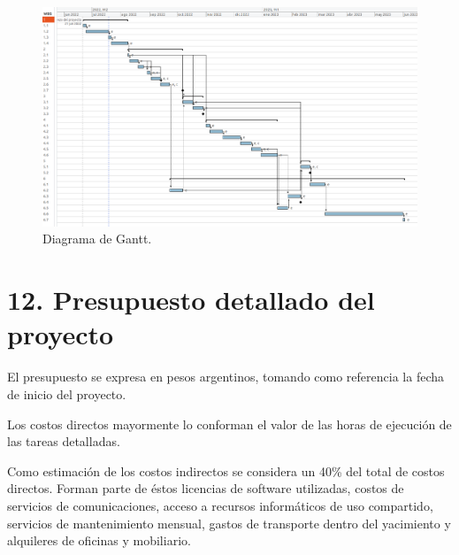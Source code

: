 \documentclass[
11pt, %
]{charter}
\begin{document}
\begin{landscape}
\begin{figure}[htpb]
\centering 
\includegraphics[height=.9\textheight]{./Figuras/Gantt.png}
\caption{Diagrama de Gantt.}
\label{fig:diagGantt}
\end{figure}

\end{landscape}



\section{12. Presupuesto detallado del proyecto}
\label{sec:presupuesto}


El presupuesto se expresa en pesos argentinos, tomando como referencia la fecha de inicio del proyecto.

Los costos directos mayormente lo conforman el valor de las horas de ejecución de las tareas detalladas.

Como estimación de los costos indirectos se considera un 40\% del total de costos directos. Forman parte de éstos licencias de software utilizadas, costos de servicios de comunicaciones, acceso a recursos informáticos de uso compartido, servicios de mantenimiento  mensual, gastos de transporte dentro del yacimiento y alquileres de oficinas y mobiliario.
\end{document}
